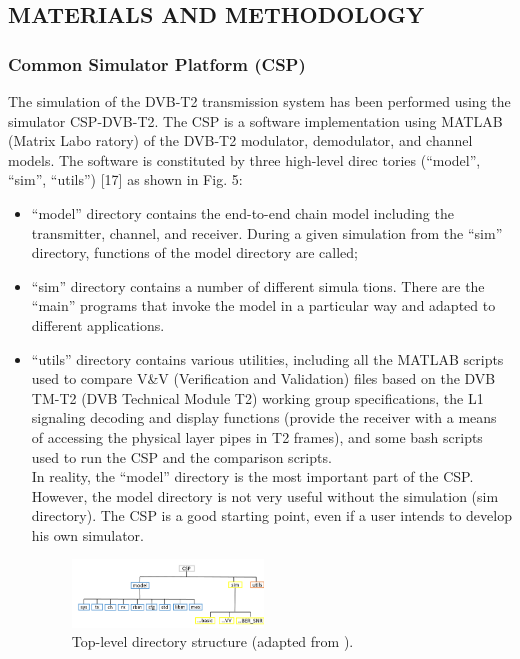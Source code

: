 \documentclass[10pt, conference]{IEEEtran}
\begin{document}
\linespread{1.055}

 \subsection{MATERIALS AND METHODOLOGY}
 
\subsubsection{Common Simulator Platform (CSP)\\} 

\normalsize{
The simulation of the DVB-T2 transmission system has
 been performed using the simulator CSP-DVB-T2. The CSP
 is a software implementation using MATLAB (Matrix Labo
ratory) of the DVB-T2 modulator, demodulator, and channel
 models. The software is constituted by three high-level direc
tories (“model”, “sim”, “utils”) [17] as shown in Fig. 5:}
\begin{itemize}
    \item \normalsize{“model” directory contains the end-to-end chain model
 including the transmitter, channel, and receiver. During a
 given simulation from the “sim” directory, functions of
 the model directory are called;} 

 \item \normalsize{ “sim” directory contains a number of different simula
tions. There are the “main” programs that invoke the
 model in a particular way and adapted to different applications.}
 \item \normalsize{ “utils” directory contains various utilities, including all
 the MATLAB scripts used to compare V\&V (Verification
 and Validation) files based on the DVB TM-T2 (DVB
 Technical Module T2) working group specifications, the
 L1 signaling decoding and display functions (provide the
 receiver with a means of accessing the physical layer
 pipes in T2 frames), and some bash scripts used to run
 the CSP and the comparison scripts.\\
 In reality, the “model” directory is the most important
 part of the CSP. However, the model directory is not very
 useful without the simulation (sim directory). The CSP
 is a good starting point, even if a user intends to develop
 his own simulator.
}

\begin{figure}[!htbp]
\centering
    \includegraphics[width=0.48\textwidth]{images/5em_image.png}
    \caption{ Top-level directory structure (adapted from \cite{17}).}
\end{figure}
 
\end{itemize}
\end{document}
